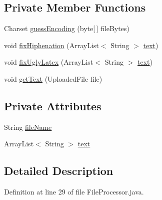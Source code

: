 \subsection*{Private Member Functions}
\begin{DoxyCompactItemize}
\item 
Charset \hyperlink{classbr_1_1usp_1_1cata_1_1util_1_1_file_processor_a81edbe34eb94a1fc6d994af481562bcf}{guess\+Encoding} (byte\mbox{[}$\,$\mbox{]} file\+Bytes)
\item 
void \hyperlink{classbr_1_1usp_1_1cata_1_1util_1_1_file_processor_a8f2687ae2fc829b8fe13315b8c6a6c5e}{fix\+Hiphenation} (Array\+List$<$ String $>$ \hyperlink{classbr_1_1usp_1_1cata_1_1util_1_1_file_processor_abc3392e9ccb3a12ea7074b43e5a2f1c5}{text})
\item 
void \hyperlink{classbr_1_1usp_1_1cata_1_1util_1_1_file_processor_a9be502939819fc86221745c151616f7a}{fix\+Ugly\+Latex} (Array\+List$<$ String $>$ \hyperlink{classbr_1_1usp_1_1cata_1_1util_1_1_file_processor_abc3392e9ccb3a12ea7074b43e5a2f1c5}{text})
\item 
void \hyperlink{classbr_1_1usp_1_1cata_1_1util_1_1_file_processor_a02528ed141dddd036ec41e8009ae84ba}{get\+Text} (Uploaded\+File file)
\end{DoxyCompactItemize}
\subsection*{Private Attributes}
\begin{DoxyCompactItemize}
\item 
String \hyperlink{classbr_1_1usp_1_1cata_1_1util_1_1_file_processor_a6c9dd23556292c88432a330db3aae182}{file\+Name}
\item 
Array\+List$<$ String $>$ \hyperlink{classbr_1_1usp_1_1cata_1_1util_1_1_file_processor_abc3392e9ccb3a12ea7074b43e5a2f1c5}{text}
\end{DoxyCompactItemize}


\subsection{Detailed Description}


Definition at line 29 of file File\+Processor.\+java.



